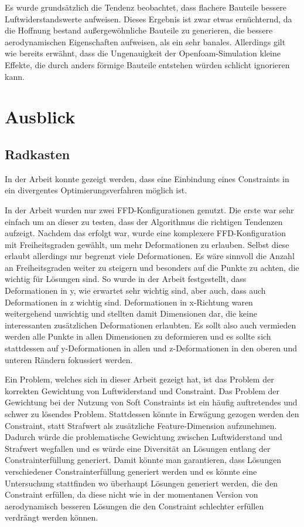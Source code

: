 Es wurde grundsätzlich die Tendenz beobachtet, dass flachere Bauteile bessere Luftwiderstandswerte aufweisen.
Dieses Ergebnis ist zwar etwas ernüchternd, da die Hoffnung bestand außergewöhnliche Bauteile zu generieren, die bessere aerodynamischen Eigenschaften aufweisen, als ein sehr banales.
Allerdings gilt wie bereits erwähnt, dass die Ungenauigkeit der Openfoam-Simulation kleine Effekte, die durch anders förmige Bauteile entstehen würden schlicht ignorieren kann.

\section{Ausblick}

\subsection{Radkasten}

In der Arbeit konnte gezeigt werden, dass eine Einbindung eines Constraints in ein divergentes Optimierungsverfahren möglich ist.

In der Arbeit wurden nur zwei FFD-Konfigurationen genutzt.
Die erste war sehr einfach um an dieser zu testen, dass der Algorithmus die richtigen Tendenzen aufzeigt.
Nachdem das erfolgt war, wurde eine komplexere FFD-Konfiguration mit Freiheitsgraden gewählt, um mehr Deformationen zu erlauben.
Selbst diese erlaubt allerdings nur begrenzt viele Deformationen.
Es wäre sinnvoll die Anzahl an Freiheitsgraden weiter zu steigern und besonders auf die Punkte zu achten, die wichtig für Lösungen sind.
So wurde in der Arbeit festgestellt, dass Deformationen in y, wie erwartet sehr wichtig sind, aber auch, dass auch Deformationen in z wichtig sind.
Deformationen in x-Richtung waren weitergehend unwichtig und stellten damit Dimensionen dar, die keine interessanten zusätzlichen Deformationen erlaubten.
Es sollt also auch vermieden werden alle Punkte in allen Dimensionen zu deformieren und es sollte sich stattdessen auf y-Deformationen in allen und z-Deformationen in den oberen und unteren Rändern fokussiert werden.

Ein Problem, welches sich in dieser Arbeit gezeigt hat, ist das Problem der korrekten Gewichtung von Luftwiderstand und Constraint.
Das Problem der Gewichtung bei der Nutzung von Soft Constraints ist ein häufig auftretendes und schwer zu lösendes Problem.
Stattdessen könnte in Erwägung gezogen werden den Constraint, statt Strafwert als zusätzliche Feature-Dimension aufzunehmen.
Dadurch würde die problematische Gewichtung zwischen Luftwiderstand und Strafwert wegfallen und es würde eine Diversität an Lösungen entlang der Constrainterfüllung generiert.
Damit könnte man garantieren, dass Lösungen verschiedener Constrainterfüllung generiert werden und es könnte eine Untersuchung stattfinden wo überhaupt Lösungen generiert werden, die den Constraint erfüllen, da diese nicht wie in der momentanen Version von aerodynamisch besseren Lösungen die den Constraint schlechter erfüllen verdrängt werden können.

